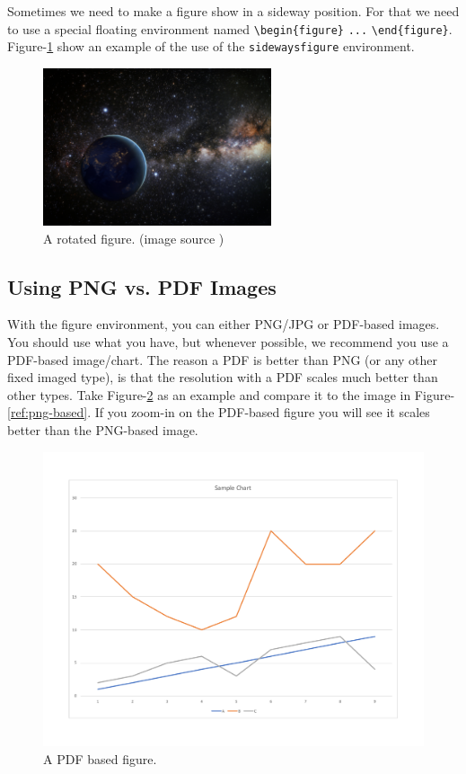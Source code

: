 Sometimes we need to make a figure show in a sideway position. For that we need to use a special floating environment named  \verb|\begin{figure}| \verb|...| \verb|\end{figure}|. Figure-\ref{fig:rotated-figure} show an example of the use of the \verb|sidewaysfigure| environment.

\clearpage
\begin{figure}
    \begin{center}
    \includegraphics[width=0.6\textwidth]{figures/samples/earth-in-space.jpg}
    \caption{A rotated figure. (image source \cite{pdp:23})}
    \label{fig:rotated-figure}
    \end{center}
\end{figure}
\clearpage

\subsection{Using PNG vs. PDF Images}

With the figure environment, you can either PNG/JPG or PDF-based images. You should use what you have, but whenever possible, we recommend you use a PDF-based image/chart. The reason a PDF is better than PNG (or any other fixed imaged type), is that the resolution with a PDF scales much better than other types. Take Figure-\ref{ref:pdf-based} as an example and compare it to the image in Figure-\ref{ref:png-based}. If you zoom-in on the PDF-based figure you will see it scales better than the PNG-based image.


\begin{figure}[H]
    \begin{center}
        \includegraphics[width=0.5\linewidth]{figures/samples/pdf-sample.pdf}
        \caption{A PDF based figure.}
        \label{ref:pdf-based}
    \end{center}
\end{figure}

